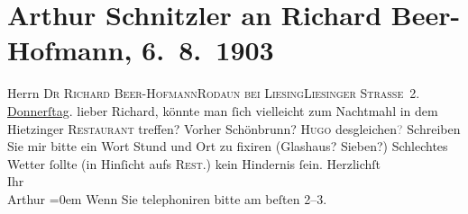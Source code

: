 

         
         \renewcommand{\erwaehntePersonen}{Personen: Richard Beer-Hofmann, Hugo von Hofmannsthal}
         \renewcommand{\erwaehnteOrte}{Orte: Liesingerstraße, Ottakringer Bräu, Palmenhaus Schönbrunn, Rodaun, Schloß Schönbrunn, Wien, XIII., Hietzing}
         \renewcommand{\erwaehnteWerke}{}
               \section[Arthur Schnitzler an Richard Beer-Hofmann, 6. 8. 1903]{ Arthur Schnitzler an Richard Beer-Hofmann, 6. 8. 1903}\nopagebreak{}\rehead{ }\begin{ledgroupsized}[t]{13cm}\normalsize\beginnumbering \toendnotes[C]{\smallbreak\pagebreak[2]} 
\toendnotes[C]{\smallbreak}\pstart{}{\pb}Herrn \textsc{Dr Richard
                     Beer-Hofmann}\pend{}\pstart{}\textsc{Rodaun bei Liesing}\pend{}\pstart{}\textsc{Liesinger Straße 2}.\pend{}{\bigskip}\pstart
           \raggedleft{}{\pb}\uline{Donnerſtag}. \pend
           \pstart{}lieber Richard,\pend\pstart
           könnte man ſich vielleicht \label{K_L01306_1v}\label{K_L01306_1h} zum Nachtmahl in dem Hietzinger \textsc{Restaurant} treffen? Vorher Schönbrunn? \textsc{Hugo} desgleichen\textcolor{gray}{?}\pend
           \pstart
           Schreiben Sie mir bitte ein Wort {\pb}Stund und Ort zu
               fixiren (Glashaus? Sieben?)
               Schlechtes Wetter ſollte (in Hinſicht aufs \textsc{Rest.}) kein
               Hindernis ſein.\pend
           \pstart
           Herzlichſt{\\[\baselineskip]}Ihr{\\[\baselineskip]}\spacefill\mbox{Arthur}\pend
           \leftskip=0em{}\pstart
           \noindent{}{\pb}Wenn Sie telephoniren bitte am beſten 2–3.\pend
           
         
         \endnumbering{}\end{ledgroupsized}  \newcommand{\dateiname}{L01306}\newcommand{\titel}{Arthur Schnitzler an Richard Beer-Hofmann, 6. 8. 1903}\newcommand{\editorInnen}{Martin Anton Müller und Gerd-Hermann Susen}
      